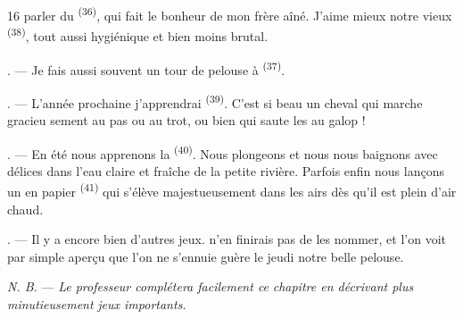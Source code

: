 \begin{VUpage}[18]{16}
\VUcontinue
parler du  \textsuperscript{(36)}, qui fait le bonheur de\nl
mon frère aîné. J'aime mieux notre vieux \nl
{} \textsuperscript{(38)}, tout aussi hygiénique et bien moins\nl
brutal.

. --- Je fais aussi souvent un tour de pelouse à\nl
{} \textsuperscript{(37)}.

. --- L'année prochaine j'apprendrai \cc
{} \textsuperscript{(39)}. C'est si beau un cheval qui marche gracieu\cc
sement au pas ou au trot, ou bien qui saute les\nl
{} au galop !

. --- En été nous apprenons la  \textsuperscript{(40)}.\nl
Nous plongeons et nous nous baignons avec délices\nl
dans l'eau claire et fraîche de la petite rivière.\nl
Parfois enfin nous lançons un  en papier \textsuperscript{(41)} qui\nl
s'élève majestueusement dans les airs dès qu'il est\nl
plein d'air chaud.

. --- Il y a encore bien d'autres jeux. \nl
n'en finirais pas de les nommer, et l'on voit par \nl
simple aperçu que l'on ne s'ennuie guère le jeudi \nl
notre belle pelouse.

\VUblancAlinea
\textit{N. B.} --- \textit{Le professeur complétera facilement ce}\nl
\textit{chapitre en décrivant plus minutieusement} \nl
\textit{jeux importants.}

\VUsaut{6.0mm}
\VUfilet{22mm}
\end{VUpage}
